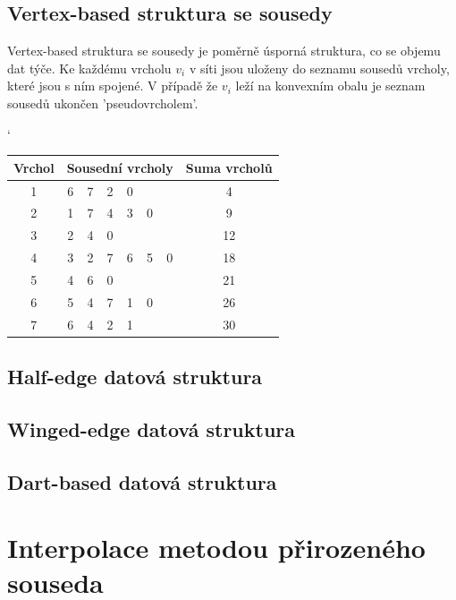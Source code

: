 \documentclass[12pt,a4paper]{article}
\begin{document}
\subsection{Vertex-based struktura se sousedy}

Vertex-based struktura se sousedy je poměrně úsporná struktura, co se objemu dat týče. Ke každému vrcholu $v_i$ v síti jsou uloženy do seznamu sousedů vrcholy, které jsou s ním spojené. V případě že $v_i$ leží na konvexním obalu je seznam sousedů ukončen 'pseudovrcholem'. 

\begin{table}[h]
\catcode`
\begin{tabular}{|c||c|c|c|c|c|c||c|}
\hline
Vrchol & \multicolumn{6}{|c|}{Sousední vrcholy} & Suma vrcholů \\ \hline \hline
1      & 6    & 7    & 2    & 0    &     &     & 4            \\ \hline
2      & 1    & 7    & 4    & 3    & 0   &     & 9            \\ \hline
3      & 2    & 4    & 0    &      &     &     & 12           \\ \hline
4      & 3    & 2    & 7    & 6    & 5   & 0   & 18           \\ \hline
5      & 4    & 6    & 0    &      &     &     & 21           \\ \hline
6      & 5    & 4    & 7    & 1    & 0   &     & 26           \\ \hline
7      & 6    & 4    & 2    & 1    &     &     & 30           \\ \hline
\end{tabular}
\end{table}

\subsection{Half-edge datová struktura}
\subsection{Winged-edge datová struktura}
\subsection{Dart-based datová struktura}

\newpage
\section{Interpolace metodou přirozeného souseda}
\end{document}
